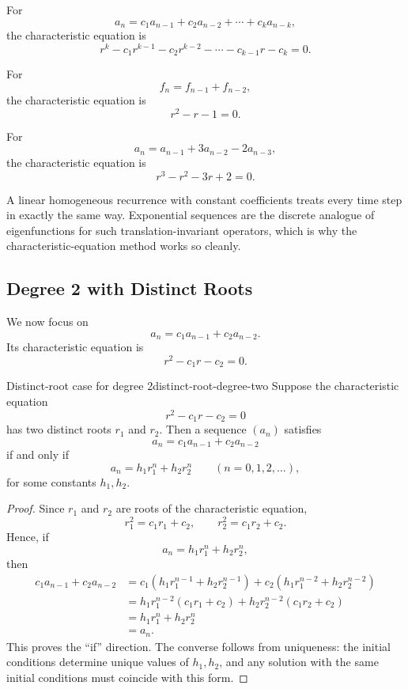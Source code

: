 \begin{keyformula}[title={Characteristic equation}]
For
\[
a_n=c_1a_{n-1}+c_2a_{n-2}+\cdots+c_ka_{n-k},
\]
the characteristic equation is
\[
r^k-c_1r^{k-1}-c_2r^{k-2}-\cdots-c_{k-1}r-c_k=0.
\]
\end{keyformula}

\begin{examplebox}[title={Characteristic equations}]
For
\[
f_n=f_{n-1}+f_{n-2},
\]
the characteristic equation is
\[
r^2-r-1=0.
\]

For
\[
a_n=a_{n-1}+3a_{n-2}-2a_{n-3},
\]
the characteristic equation is
\[
r^3-r^2-3r+2=0.
\]
\end{examplebox}

\begin{extension}[title={Why exponential trial solutions are natural}]
A linear homogeneous recurrence with constant coefficients treats every time step in exactly the same way. Exponential sequences are the discrete analogue of eigenfunctions for such translation-invariant operators, which is why the characteristic-equation method works so cleanly.
\end{extension}

\subsection{Degree 2 with Distinct Roots}

We now focus on
\[
a_n=c_1a_{n-1}+c_2a_{n-2}.
\]
Its characteristic equation is
\[
r^2-c_1r-c_2=0.
\]

\begin{theorem}{Distinct-root case for degree 2}{distinct-root-degree-two}
Suppose the characteristic equation
\[
r^2-c_1r-c_2=0
\]
has two distinct roots $r_1$ and $r_2$. Then a sequence $(a_n)$ satisfies
\[
a_n=c_1a_{n-1}+c_2a_{n-2}
\]
if and only if
\[
a_n=h_1r_1^n+h_2r_2^n
\qquad (n=0,1,2,\dots),
\]
for some constants $h_1,h_2$.
\end{theorem}

\begin{proof}
Since $r_1$ and $r_2$ are roots of the characteristic equation,
\[
r_1^2=c_1r_1+c_2,\qquad r_2^2=c_1r_2+c_2.
\]
Hence, if
\[
a_n=h_1r_1^n+h_2r_2^n,
\]
then
\begin{align*}
c_1a_{n-1}+c_2a_{n-2}
&=c_1(h_1r_1^{n-1}+h_2r_2^{n-1})+c_2(h_1r_1^{n-2}+h_2r_2^{n-2})\\
&=h_1r_1^{n-2}(c_1r_1+c_2)+h_2r_2^{n-2}(c_1r_2+c_2)\\
&=h_1r_1^n+h_2r_2^n\\
&=a_n.
\end{align*}
This proves the ``if'' direction. The converse follows from uniqueness: the initial conditions determine unique values of $h_1,h_2$, and any solution with the same initial conditions must coincide with this form.
\end{proof}

